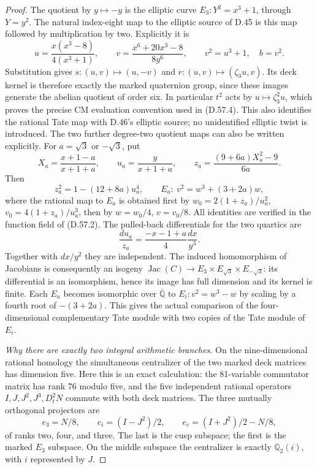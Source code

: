 \begin{proof}
The quotient by \(y\mapsto-y\) is the elliptic curve
\(E_3:Y^2=x^3+1\), through \(Y=y^2\). The natural
index-eight map to the elliptic source of D.45 is this
map followed by multiplication by two. Explicitly it is
\[
 u=\frac{x(x^3-8)}{4(x^3+1)},\qquad
 v=\frac{x^6+20x^3-8}{8y^6},\qquad
 v^2=u^3+1,\quad b=v^2.
 \tag{D.57.12}
\]
Substitution gives \(s:(u,v)\mapsto(u,-v)\) and
\(r:(u,v)\mapsto(\zeta_3u,v)\). Its deck kernel is
therefore exactly the marked quaternion group, since
these images generate the abelian quotient of order six.
In particular \(t^2\) acts by \(u\mapsto\zeta_3^2u\),
which proves the precise CM evaluation convention used
in (D.57.4). This also identifies the rational Tate map
with D.46's elliptic source; no unidentified elliptic
twist is introduced. The two further degree-two
quotient maps can also be written explicitly.
For \(a=\sqrt3\) or \(-\sqrt3\), put
\[
 X_a=\frac{x+1-a}{x+1+a},\qquad
 u_a=\frac{y}{x+1+a},\qquad
 z_a=\frac{(9+6a)X_a^2-9}{6a}.
\]
Then
\[
 z_a^2=1-(12+8a)u_a^4,\qquad
 E_a:\ v^2=w^3+(3+2a)w,
 \tag{D.57.13}
\]
where the rational map to \(E_a\) is obtained first by
\(w_0=2(1+z_a)/u_a^2\),
\(v_0=4(1+z_a)/u_a^3\), then by
\(w=w_0/4\), \(v=v_0/8\).
All identities are verified in the function field of (D.57.2).
The pulled-back differentials for the two quartics are
\[
 \frac{du_a}{z_a}=
       \frac{-x-1+a}{4}\frac{dx}{y^3}.
 \tag{D.57.14}
\]
Together with \(dx/y^2\) they are independent. The induced
homomorphism of Jacobians is consequently an isogeny
\(\operatorname{Jac}(C)\to E_3\times E_{\sqrt3}\times
E_{-\sqrt3}\): its differential is an isomorphism, hence
its image has full dimension and its kernel is finite.
Each \(E_a\) becomes isomorphic over \(\overline{\mathbb Q}\)
to \(E_i:v^2=w^3-w\) by scaling by a fourth root of
\(-(3+2a)\). This gives the actual comparison of the
four-dimensional complementary Tate module with two copies
of the Tate module of \(E_i\).

\emph{Why there are exactly two integral arithmetic branches.}
On the nine-dimensional rational homology the simultaneous
centralizer of the two marked deck matrices has dimension
five. Here this is an exact calculation: the 81-variable
commutator matrix has rank 76 modulo five, and the five
independent rational operators
\(I,J,J^2,J^3,D_t^2N\) commute with both deck matrices.
The three mutually orthogonal projectors are
\[
 e_3=N/8,\qquad e_i=(I-J^2)/2,\qquad
 e_c=(I+J^2)/2-N/8,
 \tag{D.57.15}
\]
of ranks two, four, and three. The last is the cusp subspace;
the first is the marked \(E_3\) subspace. On the middle
subspace the centralizer is exactly \(\mathbb Q_2(i)\),
with \(i\) represented by \(J\).


\end{proof}
